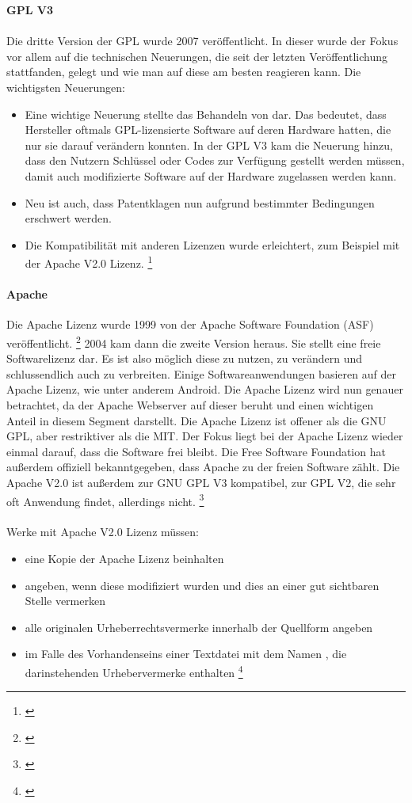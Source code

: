 \documentclass[titlepage,12pt,twoside]{article}
\begin{document}
\hfill \break
\textbf{GPL V3} \\
\\
Die dritte Version der GPL wurde 2007 veröffentlicht. In dieser wurde der Fokus vor allem auf die technischen 
Neuerungen, die seit der letzten Veröffentlichung stattfanden, gelegt und wie man auf diese am besten 
reagieren kann. Die wichtigsten Neuerungen: \\
\begin{itemize}
	\item Eine wichtige Neuerung stellte das Behandeln von  dar. Das bedeutet, dass 
	Hersteller oftmals GPL-lizensierte Software auf deren Hardware hatten, die nur sie darauf verändern 
	konnten. In der GPL V3 kam die Neuerung hinzu, dass den Nutzern Schlüssel oder Codes zur Verfügung 
	gestellt werden müssen, damit auch modifizierte Software auf der Hardware zugelassen werden kann.
	\item Neu ist auch, dass Patentklagen nun aufgrund bestimmter Bedingungen erschwert werden.
	\item Die Kompatibilität mit anderen Lizenzen wurde erleichtert, zum Beispiel mit der Apache V2.0 Lizenz. \footnote{\cite{WikipediaGPL4}}
\end{itemize}
\hfill \break
\paragraph{Apache}
\label{par:Apache}
\hfill \break
\hfill \break
Die Apache Lizenz wurde 1999 von der Apache Software Foundation (ASF) veröffentlicht. \footnote{\cite{Apache}} 2004 kam dann die 
zweite Version heraus. Sie stellt eine freie Softwarelizenz dar. Es ist also möglich diese zu nutzen, zu 
verändern und schlussendlich auch zu verbreiten. Einige Softwareanwendungen basieren auf der Apache Lizenz, 
wie unter anderem Android. Die Apache Lizenz wird nun genauer betrachtet, da der Apache Webserver auf dieser beruht und einen wichtigen Anteil 
in diesem Segment darstellt. Die Apache Lizenz ist offener als die GNU GPL, aber restriktiver als die MIT. Der Fokus liegt bei der Apache Lizenz wieder einmal darauf, dass die 
Software frei bleibt. Die Free Software Foundation hat außerdem offiziell bekanntgegeben, dass Apache zu der 
freien Software zählt. Die Apache V2.0 ist außerdem zur GNU GPL V3 kompatibel, zur GPL V2, die sehr oft 
Anwendung findet, allerdings nicht. \footnote{\cite{WikipediaApache}} \\
\\
Werke mit Apache V2.0 Lizenz müssen: \\
\begin{itemize}
	\item eine Kopie der Apache Lizenz beinhalten
	\item angeben, wenn diese modifiziert wurden und dies an einer gut sichtbaren Stelle vermerken
	\item alle originalen Urheberrechtsvermerke innerhalb der Quellform angeben
	\item im Falle des Vorhandenseins einer Textdatei mit dem Namen , die 
	darinstehenden Urhebervermerke enthalten \footnote{\cite{WikipediaApache}}
\end{itemize}
\end{document}
